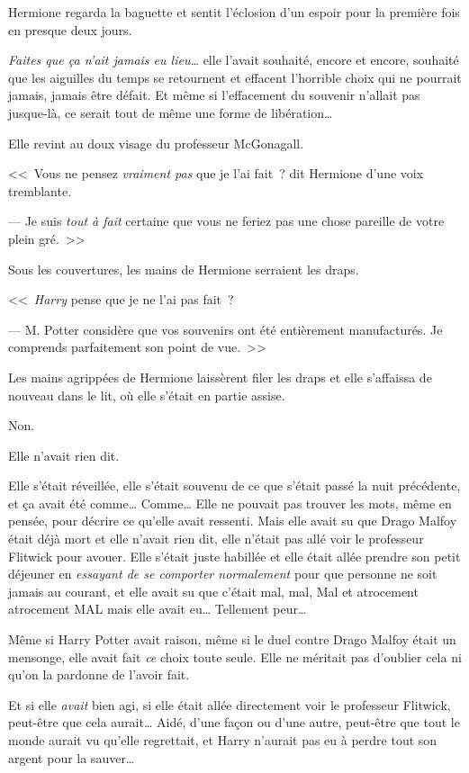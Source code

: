 Hermione regarda la baguette et sentit l'éclosion d'un espoir pour la première fois en presque deux jours.

\emph{Faites que ça n'ait jamais eu lieu…} elle l'avait souhaité, encore et encore, souhaité que les aiguilles du temps se retournent et effacent l'horrible choix qui ne pourrait jamais, jamais être défait. Et même si l'effacement du souvenir n'allait pas jusque-là, ce serait tout de même une forme de libération…

Elle revint au doux visage du professeur McGonagall.

<<~Vous ne pensez \emph{vraiment pas} que je l'ai fait~? dit Hermione d'une voix tremblante.

--- Je suis \emph{tout à fait} certaine que vous ne feriez pas une chose pareille de votre plein gré.~>>

Sous les couvertures, les mains de Hermione serraient les draps.

<<~\emph{Harry} pense que je ne l'ai pas fait~?

--- M. Potter considère que vos souvenirs ont été entièrement manufacturés. Je comprends parfaitement son point de vue.~>>

Les mains agrippées de Hermione laissèrent filer les draps et elle s'affaissa de nouveau dans le lit, où elle s'était en partie assise.

Non.

Elle n'avait rien dit.

Elle s'était réveillée, elle s'était souvenu de ce que s'était passé la nuit précédente, et ça avait été comme… Comme… Elle ne pouvait pas trouver les mots, même en pensée, pour décrire ce qu'elle avait ressenti. Mais elle avait su que Drago Malfoy était déjà mort et elle n'avait rien dit, elle n'était pas allé voir le professeur Flitwick pour avouer. Elle s'était juste habillée et elle était allée prendre son petit déjeuner en \emph{essayant de se comporter normalement} pour que personne ne soit jamais au courant, et elle avait su que c'était mal, mal, Mal et atrocement atrocement MAL mais elle avait eu… Tellement peur…

Même si Harry Potter avait raison, même si le duel contre Drago Malfoy était un mensonge, elle avait fait \emph{ce} choix toute seule. Elle ne méritait pas d'oublier cela ni qu'on la pardonne de l'avoir fait.

Et si elle \emph{avait} bien agi, si elle était allée directement voir le professeur Flitwick, peut-être que cela aurait… Aidé, d'une façon ou d'une autre, peut-être que tout le monde aurait vu qu'elle regrettait, et Harry n'aurait pas eu à perdre tout son argent pour la sauver…

